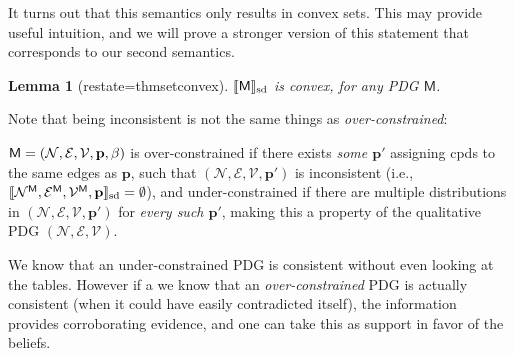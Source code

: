 \documentclass{article}
\theoremstyle{plain}
\newtheorem{lemma}[theorem]{Lemma}
\theoremstyle{definition}
\theoremstyle{remark}
\newcommand\mat[1]{\mathbf{#1}}
\newcommand{\notation}[2][]{#1}
\renewcommand{\notation}[2][]{{\color{notationcolor} #2}}
\DeclarePairedDelimiter{\SD}{\llbracket}{\rrbracket_{\text{sd}}}
\newcommand{\V}{\mathcal V}
\newcommand{\N}{\mathcal N}
\newcommand{\Ed}{\mathcal E}
\newcommand{\sfM}{\mathsf M}
\newcommand{\MN}{PDG}
\numberwithin{equation}{section}
\begin{document}
	\begin{vfull}
		It turns out that this semantics only results in convex sets. This may provide useful intuition, and we will prove a stronger version of this statement that corresponds to our second semantics.
		\begin{lemma}[restate=thmsetconvex] 
			\label{prop:convex}
			$\SD{\sfM}$ is convex, for any PDG $\sfM$.
		\end{lemma}
	
		Note that being inconsistent is not the same things as \emph{over-constrained}: 	
		\begin{defn}

			$\sfM = \mnvars[]$ is over-constrained if there exists
			  \emph{some $\mat p'$} assigning cpds to the same edges as
			  $\mat p$, such that $(\N, \Ed, \V, \mat p')$ is inconsistent
			  \notation{(i.e., $\SD{\N^\sfM, \Ed^\sfM, \V^\sfM, \mat p}
				= \emptyset$)}, and under-constrained if there are
			  multiple distributions in $(\N, \Ed, \V, \mat p')$ for
			  \emph{every such $\mat p'$}, making this a property of the
			  qualitative PDG $(\N, \Ed, \V)$.  
		\end{defn}

		We know that an under-constrained PDG is consistent without even looking at the tables. However if a we know that an \emph{over-constrained} PDG is actually consistent (when it could have easily contradicted itself), the information provides corroborating evidence, and one can take this as support in favor of the beliefs. 
	\end{vfull}
        
\end{document}
